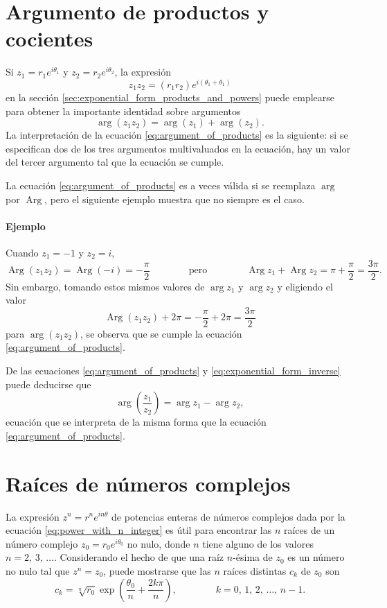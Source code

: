\documentclass[a4paper]{report}
\DeclareMathOperator{\Arg}{Arg}
\begin{document}
\section{Argumento de productos y cocientes}\label{sec:argument_of_products}

Si \(z_1=r_1e^{i\theta_1}\) y \(z_2=r_2e^{i\theta_2}\), la expresión
\[
 z_1z_2=(r_1r_2)e^{i(\theta_1+\theta_1)}
\]
en la sección \ref{sec:exponential_form_products_and_powers} puede emplearse para obtener la importante identidad sobre argumentos
\begin{equation}\label{eq:argument_of_products}
 \arg(z_1z_2)=\arg(z_1)+\arg(z_2). 
\end{equation} 
La interpretación de la ecuación \ref{eq:argument_of_products} es la siguiente: si se especifican dos de los tres argumentos multivaluados en la ecuación, hay un valor del tercer argumento tal que la ecuación se cumple.

La ecuación \ref{eq:argument_of_products} es a veces válida si se reemplaza \(\arg\) por \(\Arg\), pero el siguiente ejemplo muestra que no siempre es el caso.

\paragraph{Ejemplo} Cuando \(z_1=-1\) y \(z_2=i\),
\[
 \Arg(z_1z_2)=\Arg(-i)=-\frac{\pi}{2}
 \qquad\qquad\textrm{pero}\qquad\qquad
 \Arg z_1+\Arg z_2=\pi+\frac{\pi}{2}=\frac{3\pi}{2}.
\]
Sin embargo, tomando estos mismos valores de \(\arg z_1\) y \(\arg z_2\) y eligiendo el valor 
\[
 \Arg(z_1z_2)+2\pi=-\frac{\pi}{2}+2\pi=\frac{3\pi}{2}
\]
para \(\arg(z_1z_2)\), se observa que se cumple la ecuación \ref{eq:argument_of_products}.

De las ecuaciones \ref{eq:argument_of_products} y \ref{eq:exponential_form_inverse} puede deducirse que 
\begin{equation}\label{eq:argument_of_quotient}
 \arg\left(\frac{z_1}{z_2}\right)=\arg z_1-\arg z_2, 
\end{equation}
ecuación que se interpreta de la misma forma que la ecuación \ref{eq:argument_of_products}.

\section{Raíces de números complejos}

La expresión \(z^n=r^ne^{in\theta}\) de potencias enteras de números complejos dada por la ecuación \ref{eq:power_with_n_integer} es útil para encontrar las \(n\) raíces de un número complejo \(z_0=r_0e^{i\theta_0}\) no nulo, donde \(n\) tiene alguno de los valores \(n=2,\,3,\,\dots\). Considerando el hecho de que una raíz \(n\)-ésima de \(z_0\) es un número no nulo tal que \(z^n=z_0\), puede mostrarse que las \(n\) raíces distintas \(c_k\) de \(z_0\) son
\begin{equation}\label{eq:roots_n}
 c_k=\sqrt[n]{r_0}\exp\left(\frac{\theta_0}{n}+\frac{2k\pi}{n}\right),
 \qquad\qquad k=0,\,1,\,2,\,\dots,\,n-1. 
\end{equation}
\end{document}
